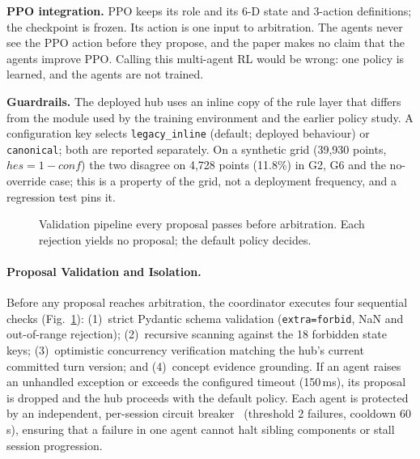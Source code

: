 \textbf{PPO integration.} PPO keeps its role and its 6-D state and 3-action definitions; the checkpoint is frozen. Its action is one input to arbitration. The agents never see the PPO action before they propose, and the paper makes no claim that the agents improve PPO. Calling this multi-agent RL would be wrong: one policy is learned, and the agents are not trained.

\textbf{Guardrails.} The deployed hub uses an inline copy of the rule layer that differs from the module used by the training environment and the earlier policy study. A configuration key selects \texttt{legacy\_inline} (default; deployed behaviour) or \texttt{canonical}; both are reported separately. On a synthetic grid (39,930 points, $\mathit{hes}=1-\mathit{conf}$) the two disagree on 4,728 points (11.8\%) in G2, G6 and the no-override case; this is a property of the grid, not a deployment frequency, and a regression test pins it.

\begin{figure}[tbp]
\centering
\resizebox{\textwidth}{!}{}
\caption{Validation pipeline every proposal passes before arbitration. Each rejection yields no proposal; the default policy decides.}\label{fig:valid}
\end{figure}
\paragraph{Proposal Validation and Isolation.} Before any proposal reaches arbitration, the coordinator executes four sequential checks (Fig.~\ref{fig:valid}): (1)~strict Pydantic schema validation (\texttt{extra=forbid}, NaN and out-of-range rejection); (2)~recursive scanning against the 18 forbidden state keys; (3)~optimistic concurrency verification matching the hub's current committed turn version; and (4)~concept evidence grounding. If an agent raises an unhandled exception or exceeds the configured timeout (150\,ms), its proposal is dropped and the hub proceeds with the default policy. Each agent is protected by an independent, per-session circuit breaker~\cite{nygard} (threshold 2 failures, cooldown 60\,s), ensuring that a failure in one agent cannot halt sibling components or stall session progression.

